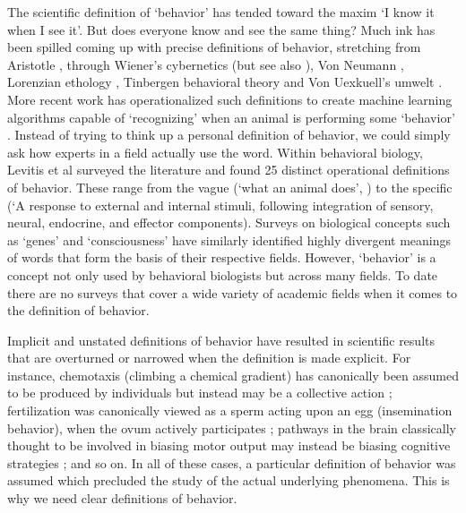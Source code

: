 \documentclass[a4paper, 11pt]{article}
\begin{document}
The scientific definition of `behavior' has tended toward the maxim `I know it when I see it'. But does everyone know and see the same thing? Much ink has been spilled coming up with precise definitions of behavior, stretching from Aristotle \cite{aristotle}, through Wiener's cybernetics \cite{wiener2019cybernetics} (but see also \cite{rosenblueth1943behavior}), Von Neumann \cite{von2012computer}, Lorenzian ethology \cite{lorenz2013foundations}, Tinbergen behavioral theory \cite{tinbergen1972animal} and Von Uexkuell's umwelt \cite{uexkull1921umwelt}. More recent work has operationalized such definitions to create machine learning algorithms capable of `recognizing' when an animal is performing some `behavior' \cite{berman2014mapping,wiltschko2015mapping,calhoun2019unsupervised}. Instead of trying to think up a personal definition of behavior, we could simply ask how experts in a field actually use the word. Within behavioral biology, Levitis et al \cite{levitis2009behavioural} surveyed the literature and found 25 distinct operational definitions of behavior. These range from the vague (`what an animal does', \cite{davis1966integral}) to the specific (`A response to external and internal stimuli, following integration of sensory, neural, endocrine, and effector components). Surveys on biological concepts such as `genes' and `consciousness' \cite{consciousness-2021,stotz2004biologists} have similarly identified highly divergent meanings of words that form the basis of their respective fields. However, `behavior' is a concept not only used by behavioral biologists but across many fields. To date there are no surveys that cover a wide variety of academic fields when it comes to the definition of behavior.

Implicit and unstated definitions of behavior have resulted in scientific results that are overturned or narrowed when the definition is made explicit. For instance, chemotaxis (climbing a chemical gradient) has canonically been assumed to be produced by individuals but instead may be a collective action \cite{ramdya2014group}; fertilization was canonically viewed as a sperm acting upon an egg (insemination behavior), when the ovum actively participates \cite{kekalainen2018gamete}; pathways in the brain classically thought to be involved in biasing motor output may instead be biasing cognitive strategies \cite{bolkan2021strong}; and so on. In all of these cases, a particular definition of behavior was assumed which precluded the study of the actual underlying phenomena. This is why we need clear definitions of behavior.
\end{document}
